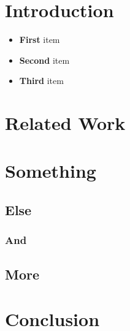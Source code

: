 \chapter{Introduction} %


\begin{itemize}
	\item \textbf{First} item
	\item \textbf{Second} item
	\item \textbf{Third} item
\end{itemize}

\chapter{Related Work} %

\blindtext[2]
\cite{Tolk12}


\chapter{Something} %

\blindtext[2]

\section{Else}

\subsection{And}
\blindtext[1]

\section{More}
\blindtext[1]

\chapter{Conclusion} %

\blindtext[2]
